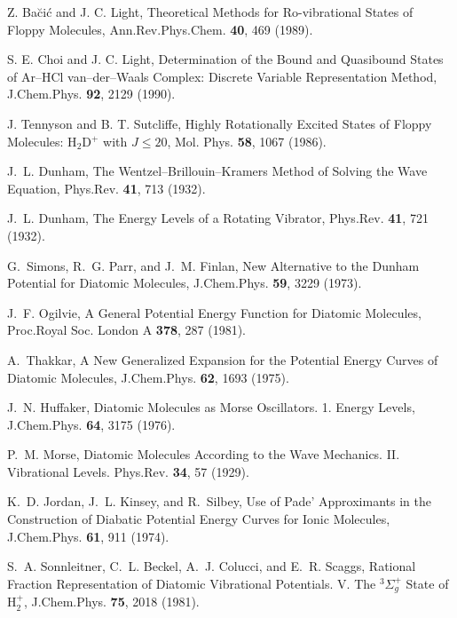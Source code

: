 \begin{thebibliography}{999}
Z. Ba\u{c}i\'{c} and J. C. Light, 
Theoretical Methods for Ro-vibrational States of Floppy 
Molecules,
Ann.Rev.Phys.Chem. {\bf 40}, 
469 (1989).

S. E. Choi and J. C. Light, 
Determination of the Bound and Quasibound States of Ar--HCl
van--der--Waals Complex:
Discrete Variable Representation Method,
J.Chem.Phys. {\bf 92}, 2129 (1990).

J. Tennyson and B. T. Sutcliffe, 
Highly Rotationally Excited
States of Floppy Molecules: H$_2$D$^+$ with $J \leq 20$,
Mol. Phys. {\bf 58}, 1067 (1986).


J.~L. Dunham,
The Wentzel--Brillouin--Kramers Method of Solving
the Wave Equation,
\newblock Phys.Rev. {\bf 41}, 713 (1932).

J.~L. Dunham,
The Energy Levels of a Rotating Vibrator,
\newblock Phys.Rev. {\bf 41}, 721 (1932).

G.~Simons, R.~G. Parr, and J.~M. Finlan,
New Alternative to the Dunham Potential for Diatomic Molecules,
\newblock J.Chem.Phys. {\bf 59}, 3229 (1973).

J.~F. Ogilvie,
A General Potential Energy Function for Diatomic Molecules,
\newblock Proc.Royal Soc. London A {\bf 378}, 287 (1981).

A.~Thakkar,
A New Generalized Expansion for the Potential Energy 
Curves of Diatomic Molecules,
\newblock J.Chem.Phys. {\bf 62}, 1693 (1975).

J.~N. Huffaker,
Diatomic Molecules as Morse Oscillators. 1. Energy Levels,
\newblock J.Chem.Phys. {\bf 64}, 3175 (1976).

P.~M. Morse,
Diatomic Molecules According to the Wave Mechanics. II. 
Vibrational Levels.
\newblock Phys.Rev. {\bf 34}, 57 (1929).

K.~D. Jordan, J.~L. Kinsey, and R.~Silbey,
Use of Pade' Approximants in the Construction of 
Diabatic Potential Energy Curves for Ionic Molecules,
\newblock J.Chem.Phys. {\bf 61}, 911 (1974).


S.~A. Sonnleitner, C.~L. Beckel, A.~J. Colucci, and E.~R. Scaggs,
Rational Fraction Representation of Diatomic 
Vibrational Potentials. V. The $^{3} \Sigma_g^+ $ State of H$_2^+$,
\newblock J.Chem.Phys. {\bf 75}, 2018 (1981).


\end{thebibliography}
